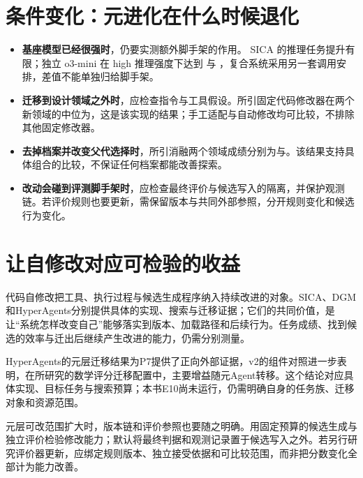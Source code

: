 \section{条件变化：元进化在什么时候退化}
\label{sec:ch12-conditions}

\begin{itemize}
  \item \textbf{基座模型已经很强时}，仍要实测额外脚手架的作用。
        SICA 的推理任务提升有限；独立 o3-mini 在 high 推理强度下达到  与 ，复合系统采用另一套调用安排，差值不能单独归给脚手架。
  \item \textbf{迁移到设计领域之外时}，应检查指令与工具假设。所引固定代码修改器在两个新领域的中位为，这是该实现的结果；手工适配与自动修改均可比较，不排除其他固定修改器。
  \item \textbf{去掉档案并改变父代选择时}，所引消融两个领域成绩分别为与。该结果支持具体组合的比较，不保证任何档案都能改善探索。
  \item \textbf{改动会碰到评测脚手架时}，应检查最终评价与候选写入的隔离，并保护观测链。若评价规则也要更新，需保留版本与共同外部参照，分开规则变化和候选行为变化。
\end{itemize}

\section{让自修改对应可检验的收益}
\label{sec:ch12-claims}

代码自修改把工具、执行过程与候选生成程序纳入持续改进的对象。SICA、DGM和HyperAgents分别提供具体的实现、搜索与迁移证据；它们的共同价值，是让“系统怎样改变自己”能够落实到版本、加载路径和后续行为。任务成绩、找到候选的效率与迁出后继续产生改进的能力，仍需分别测量。

HyperAgents的元层迁移结果为P7提供了正向外部证据，v2的组件对照进一步表明，在所研究的数学评分迁移配置中，主要增益随元Agent转移。这个结论对应具体实现、目标任务与搜索预算；本书E10尚未运行，仍需明确自身的任务族、迁移对象和资源范围。

\begin{principlebox}
元层可改范围扩大时，版本链和评价参照也要随之明确。用固定预算的候选生成与独立评价检验修改能力；默认将最终判据和观测记录置于候选写入之外。若另行研究评价器更新，应绑定规则版本、独立接受依据和可比较范围，而非把分数变化全部计为能力改善。
\end{principlebox}


